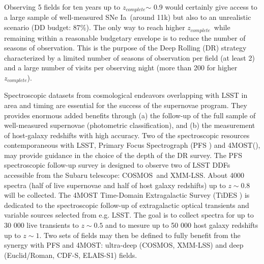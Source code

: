 \documentclass[\docopts]{\docclass}
\newcommand{\cosmos}{{COSMOS}}
\newcommand{\elais}{{ELAIS-S1}}
\newcommand{\xmm}{{XMM-LSS}}
\newcommand{\cdfs}{{CDF-S}}
\newcommand{\adfs}{{Euclid/Roman}}
\newcommand{\sne}{{SNe Ia}}
\newcommand{\zcomp}{\mbox{$z_{complete}$}}
\begin{document}
Observing 5 fields for ten years up to \zcomp $\sim$ 0.9 would certainly give access to a large sample of well-measured \sne~(around 11k) but also to an unrealistic scenario (DD budget: 87\%). The only way to reach higher \zcomp~while remaining within a reasonable budgetary envelope is to reduce the number of seasons of observation. This is the purpose of the Deep Rolling (DR) strategy characterized by a limited number of seasons of observation per field (at least 2) and a large number of visits per observing night (more than 200 for higher \zcomp).
\par
Spectroscopic datasets from cosmological endeavors overlapping with LSST in area and timing are essential for the success of the supernovae program. They provides enormous added benefits through (a) the follow-up of the full sample of well-measured supernovae (photometric classification), and (b) the measurement of host-galaxy redshifts with high accuracy. Two of the spectroscopic resources contemporaneous with LSST, Primary Focus Spectrograph (PFS \cite{Tamura_2016}) and 4MOST(\cite{4MOST}), may provide guidance in the choice of the depth of the DR survey. The PFS spectroscopic follow-up survey is designed to observe two of LSST DDFs accessible from the Subaru telescope: \cosmos~and \xmm. About 4000 spectra (half of live supernovae and half of host galaxy redshifts) up to $z\sim0.8$ will be collected. The 4MOST Time-Domain Extragalactic Survey (TiDES \cite{TiDES}) is dedicated to the spectroscopic follow-up of extragalactic optical transients and variable sources selected from e.g. LSST. The goal is to collect spectra for up to 30 000 live transients to $z\sim0.5$ and to mesure up to 50 000 host galaxy redshifts up to $z\sim1$. Two sets of fields may then be defined to fully benefit from the synergy with PFS and 4MOST: ultra-deep (\cosmos, \xmm) and deep (\adfs, \cdfs, \elais) fields.
\end{document}

